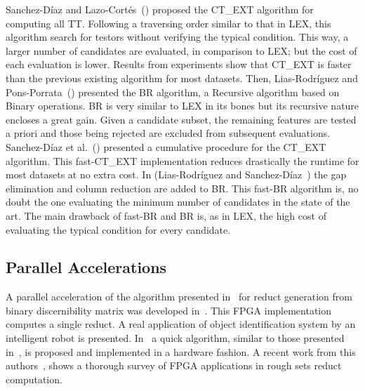 \documentclass[authoryear,11pt]{elsarticle}
\begin{document}
  Sanchez-D\'iaz and Lazo-Cort\'es~(\cite{Sanchez07}) proposed the CT\_EXT algorithm for computing all
  TT. Following a traversing order similar to that in LEX, this algorithm search for
  testors without verifying the typical condition. This way, a larger number of candidates are 
  evaluated, in comparison to LEX; but the cost of each evaluation is lower. Results from experiments
  show that CT\_EXT is faster than the previous existing algorithm for most datasets. Then, Lias-Rodr\'iguez
  and Pons-Porrata~(\cite{Lias09}) presented the BR algorithm, a Recursive algorithm based on 
  Binary operations. BR is very similar to LEX in its bones but its recursive nature encloses a great
  gain. Given a candidate subset, the remaining features are tested a priori and those being rejected are
  excluded from subsequent evaluations. Sanchez-D\'iaz et al.~(\cite{Sanchez10}) presented a cumulative
  procedure for the CT\_EXT algorithm. This fast-CT\_EXT implementation reduces drastically the runtime
  for most datasets at no extra cost. In (Lias-Rodr\'iguez and Sanchez-D\'iaz~\cite{Lias13}) the
  gap elimination and column reduction are added to BR. This fast-BR algorithm is, no doubt the one 
  evaluating the minimum number of candidates in the state of the art. The main drawback of fast-BR and 
  BR is, as in LEX, the high cost of evaluating the typical condition for every candidate. 
  
\subsection{Parallel Accelerations}

  A parallel acceleration of the algorithm presented in~\citep{Yang08} for reduct generation from binary
  discernibility matrix was developed in~\citep{Tiwari11,Tiwari12}. This FPGA implementation computes a 
  single reduct. A real application of object identification system by an intelligent robot is presented.
  In~\citep{Tiwari13} a quick algorithm, similar to those presented in~\citep{Chouchoulas01}, is proposed
  and implemented in a hardware fashion. A recent work from this authors~\citep{Tiwari14}, shows a thorough
  survey of FPGA applications in rough sets reduct computation.
\end{document}
